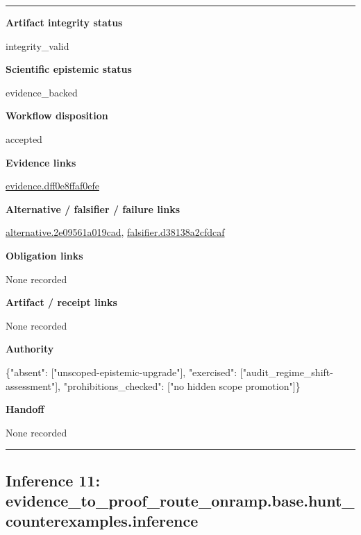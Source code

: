 \documentclass[10pt,a4paper]{article}
\newcommand{\TraceField}[2]{\par\noindent\textbf{#1}\par\noindent #2\par\smallskip}
\newenvironment{TraceDossier}{\par\medskip\noindent\hrule\medskip}{\medskip\hrule\par\medskip}
\begin{document}
\begin{TraceDossier}
\TraceField{Artifact integrity status}{integrity\_\allowbreak{}valid}

\TraceField{Scientific epistemic status}{evidence\_\allowbreak{}backed}

\TraceField{Workflow disposition}{accepted}

\TraceField{Evidence links}{\hyperlink{trace-evidence-18b9b7f758e1605b18}{evidence.\allowbreak{}dff0e8ffaf\allowbreak{}0efe}}

\TraceField{Alternative / falsifier / failure links}{\hyperlink{trace-alternative-1c893e4c378ecc4e34}{alternativ\allowbreak{}e.\allowbreak{}2e09561a01\allowbreak{}9cad}, \hyperlink{trace-alternative-bd084e5f221901de20}{falsifier.\allowbreak{}d38138a2cf\allowbreak{}dcaf}}

\TraceField{Obligation links}{None recorded}

\TraceField{Artifact / receipt links}{None recorded}

\TraceField{Authority}{\{"absent":\allowbreak{} ["unscoped\allowbreak{}-\allowbreak{}epistemic-\allowbreak{}upgrade"],\allowbreak{} "exercised\allowbreak{}":\allowbreak{} ["audit\_\allowbreak{}regime\_\allowbreak{}shift-\allowbreak{}assessment\allowbreak{}"], "prohibiti\allowbreak{}ons\_\allowbreak{}checked":\allowbreak{} ["no hidden scope promotion"\allowbreak{}]\}}

\TraceField{Handoff}{None recorded}

\end{TraceDossier}
\pagebreak[2]\subsection{Inference 11: evidence\_\allowbreak{}to\_\allowbreak{}proof\_\allowbreak{}route\_\allowbreak{}onramp.\allowbreak{}base.\allowbreak{}hunt\_\allowbreak{}counterexa\allowbreak{}mples.\allowbreak{}inference}\label{trace-inference-8d75bbeef1017b0543}
\end{document}

